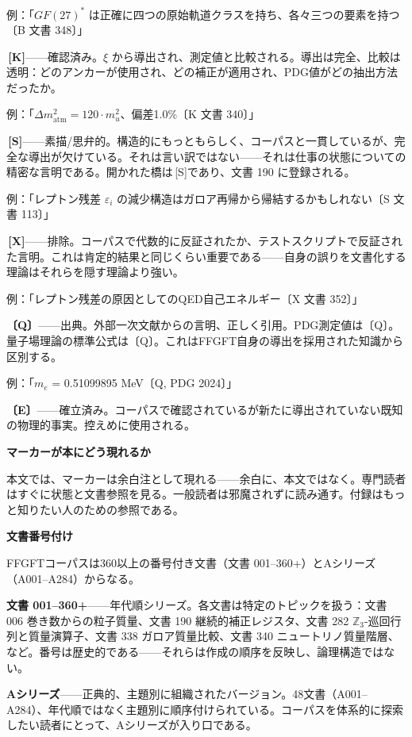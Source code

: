 \documentclass[11pt,openany]{book}
\newcommand{\status}[1]{\penalty10000\,{\tiny\textcolor{gray!70}{[#1]}}}
\begin{document}
例：「$GF(27)^*$ は正確に四つの原始軌道クラスを持ち、各々三つの要素を持つ〔B 文書 348〕」

\textbf{\status{K}}——確認済み。$\xi$ から導出され、測定値と比較される。導出は完全、比較は透明：どのアンカーが使用され、どの補正が適用され、PDG値がどの抽出方法だったか。

例：「$\Delta m^2_\text{atm} = 120\cdot m_
u^2$、偏差1.0\%〔K 文書 340〕」

\textbf{\status{S}}——素描/思弁的。構造的にもっともらしく、コーパスと一貫しているが、完全な導出が欠けている。それは言い訳ではない——それは仕事の状態についての精密な言明である。開かれた橋は\status{S}であり、文書 190 に登録される。

例：「レプトン残差 $\varepsilon_i$ の減少構造はガロア再帰から帰結するかもしれない〔S 文書 113〕」

\textbf{\status{X}}——排除。コーパスで代数的に反証されたか、テストスクリプトで反証された言明。これは肯定的結果と同じくらい重要である——自身の誤りを文書化する理論はそれらを隠す理論より強い。

例：「レプトン残差の原因としてのQED自己エネルギー〔X 文書 352〕」

\textbf{〔Q〕}——出典。外部一次文献からの言明、正しく引用。PDG測定値は〔Q〕。量子場理論の標準公式は〔Q〕。これはFFGFT自身の導出を採用された知識から区別する。

例：「$m_e$ = 0.51099895 MeV〔Q, PDG 2024〕」

\textbf{〔E〕}——確立済み。コーパスで確認されているが新たに導出されていない既知の物理的事実。控えめに使用される。

\textbf{マーカーが本にどう現れるか}

本文では、マーカーは余白注として現れる——余白に、本文ではなく。専門読者はすぐに状態と文書参照を見る。一般読者は邪魔されずに読み通す。付録はもっと知りたい人のための参照である。

\textbf{文書番号付け}

FFGFTコーパスは360以上の番号付き文書（文書 001–360+）とAシリーズ（A001–A284）からなる。

\textbf{文書 001–360+}——年代順シリーズ。各文書は特定のトピックを扱う：文書 006 巻き数からの粒子質量、文書 190 継続的補正レジスタ、文書 282 $\mathbb{Z}_3$-巡回行列と質量演算子、文書 338 ガロア質量比較、文書 340 ニュートリノ質量階層、など。番号は歴史的である——それらは作成の順序を反映し、論理構造ではない。

\textbf{Aシリーズ}——正典的、主題別に組織されたバージョン。48文書（A001–A284）、年代順ではなく主題別に順序付けられている。コーパスを体系的に探索したい読者にとって、Aシリーズが入り口である。
\end{document}
